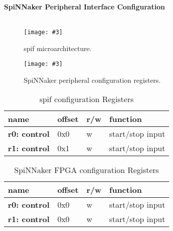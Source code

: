 \documentclass[11pt,a4paper,twoside]{article}
\newcommand{\image}[5][]
{
\begin{figure}[#2]
   \begin{center}
      \texttt{[image: \#3]}
      \caption{#5}
      \label{fig:#4}
   \end{center}
\end{figure}
}
\begin{document}
\begin{center}
	\textbf{
		\Large{SpiNNaker Peripheral Interface Configuration} \\
		\vspace*{0.5cm}
		\large {\myversion} \\
		\vspace*{0.5cm}
		\large{\mydate}
	}
\end{center}


\image[width = \textwidth]{!h}{spif_bd}{fig:spif_bd}
	{spif microarchitecture.}


\image[width = 0.9 \textwidth]{!h}{spif_cf}{fig:spif_cf}
{SpiNNaker peripheral configuration registers.}


\begin{table}[!ht]
	\caption{spif configuration Registers}
	\begin{center}
		\renewcommand{\arraystretch}{1.2}
		\begin{tabularx}{\textwidth}{| p{\ncw} p{\ocw} p{\rcw} X |}
			\hline
			\textbf{name}        & \textbf{offset} & \textbf{r/w} & \textbf{function} \\%
			\hline
			\hline
			\textbf{r0: control} & 0x0             & w            & start/stop input  \\%
			\textbf{r1: control} & 0x1             & w            & start/stop input  \\%
			\hline
		\end{tabularx}
	\end{center}
	\label{tab:resources}
\end{table}


\begin{table}[!ht]
	\caption{SpiNNaker FPGA configuration Registers}
	\begin{center}
		\renewcommand{\arraystretch}{1.2}
		\begin{tabularx}{\textwidth}{| p{\ncw} p{\ocw} p{\rcw} X |}
			\hline
			\textbf{name}        & \textbf{offset} & \textbf{r/w} & \textbf{function} \\%
			\hline
			\hline
			\textbf{r0: control} & 0x0             & w            & start/stop input  \\%
			\textbf{r1: control} & 0x0             & w            & start/stop input  \\%
			\hline
		\end{tabularx}
	\end{center}
	\label{tab:resources}
\end{table}
\end{document}
